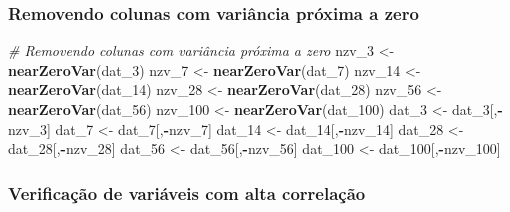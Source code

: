 \documentclass[]{article}
\newenvironment{Shaded}{\begin{snugshade}}{\end{snugshade}}
\newcommand{\CommentTok}[1]{\textcolor[rgb]{0.56,0.35,0.01}{\textit{#1}}}
\newcommand{\DecValTok}[1]{\textcolor[rgb]{0.00,0.00,0.81}{#1}}
\newcommand{\KeywordTok}[1]{\textcolor[rgb]{0.13,0.29,0.53}{\textbf{#1}}}
\newcommand{\NormalTok}[1]{#1}
\newcommand{\OperatorTok}[1]{\textcolor[rgb]{0.81,0.36,0.00}{\textbf{#1}}}
\newcommand{\StringTok}[1]{\textcolor[rgb]{0.31,0.60,0.02}{#1}}
\begin{document}
\hypertarget{removendo-colunas-com-variuxe2ncia-pruxf3xima-a-zero}{%
\subsubsection{Removendo colunas com variância próxima a
zero}\label{removendo-colunas-com-variuxe2ncia-pruxf3xima-a-zero}}

\label{show-nzv}

\begin{Shaded}
\begin{Highlighting}[]
\CommentTok{# Removendo colunas com variância próxima a zero}
\NormalTok{nzv_}\DecValTok{3}\NormalTok{ <-}\StringTok{ }\KeywordTok{nearZeroVar}\NormalTok{(dat_}\DecValTok{3}\NormalTok{)}
\NormalTok{nzv_}\DecValTok{7}\NormalTok{ <-}\StringTok{ }\KeywordTok{nearZeroVar}\NormalTok{(dat_}\DecValTok{7}\NormalTok{)}
\NormalTok{nzv_}\DecValTok{14}\NormalTok{ <-}\StringTok{ }\KeywordTok{nearZeroVar}\NormalTok{(dat_}\DecValTok{14}\NormalTok{)}
\NormalTok{nzv_}\DecValTok{28}\NormalTok{ <-}\StringTok{ }\KeywordTok{nearZeroVar}\NormalTok{(dat_}\DecValTok{28}\NormalTok{)}
\NormalTok{nzv_}\DecValTok{56}\NormalTok{ <-}\StringTok{ }\KeywordTok{nearZeroVar}\NormalTok{(dat_}\DecValTok{56}\NormalTok{)}
\NormalTok{nzv_}\DecValTok{100}\NormalTok{ <-}\StringTok{ }\KeywordTok{nearZeroVar}\NormalTok{(dat_}\DecValTok{100}\NormalTok{)}
\NormalTok{dat_}\DecValTok{3}\NormalTok{ <-}\StringTok{ }\NormalTok{dat_}\DecValTok{3}\NormalTok{[,}\OperatorTok{-}\NormalTok{nzv_}\DecValTok{3}\NormalTok{]}
\NormalTok{dat_}\DecValTok{7}\NormalTok{ <-}\StringTok{ }\NormalTok{dat_}\DecValTok{7}\NormalTok{[,}\OperatorTok{-}\NormalTok{nzv_}\DecValTok{7}\NormalTok{]}
\NormalTok{dat_}\DecValTok{14}\NormalTok{ <-}\StringTok{ }\NormalTok{dat_}\DecValTok{14}\NormalTok{[,}\OperatorTok{-}\NormalTok{nzv_}\DecValTok{14}\NormalTok{]}
\NormalTok{dat_}\DecValTok{28}\NormalTok{ <-}\StringTok{ }\NormalTok{dat_}\DecValTok{28}\NormalTok{[,}\OperatorTok{-}\NormalTok{nzv_}\DecValTok{28}\NormalTok{]}
\NormalTok{dat_}\DecValTok{56}\NormalTok{ <-}\StringTok{ }\NormalTok{dat_}\DecValTok{56}\NormalTok{[,}\OperatorTok{-}\NormalTok{nzv_}\DecValTok{56}\NormalTok{]}
\NormalTok{dat_}\DecValTok{100}\NormalTok{ <-}\StringTok{ }\NormalTok{dat_}\DecValTok{100}\NormalTok{[,}\OperatorTok{-}\NormalTok{nzv_}\DecValTok{100}\NormalTok{]}
\end{Highlighting}
\end{Shaded}

\hypertarget{verificauxe7uxe3o-de-variuxe1veis-com-alta-correlauxe7uxe3o}{%
\subsubsection{Verificação de variáveis com alta
correlação}\label{verificauxe7uxe3o-de-variuxe1veis-com-alta-correlauxe7uxe3o}}
\end{document}
